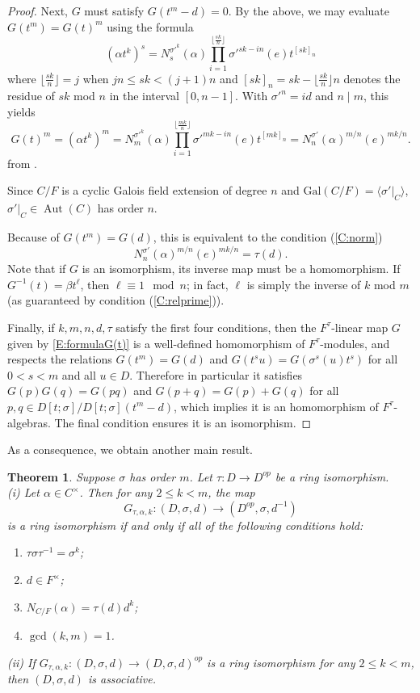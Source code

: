 \documentclass{amsart}
\theoremstyle{plain}
\newtheorem{theorem}{Theorem}[section]
\theoremstyle{definition}
\numberwithin{equation}{section}
\numberwithin{figure}{section}
\DeclareMathOperator{\Aut}{Aut}
\begin{document}
\begin{proof}
Next, $G$ must satisfy $G(t^{m}-d)=0$.  By the above, we may evaluate $G(t^{m})=G(t)^{m}$ using the formula
$$
(\alpha t^k)^s = N_{s}^{{\sigma'}^k}(\alpha)\prod_{i=1}^{\lfloor \frac{sk}{{n}}\rfloor} {\sigma'}^{sk-i{n}}(e)t^{[sk]_{n}}
$$
where $\lfloor \frac{sk}{n}\rfloor=j$ when $j{n}\leq sk<(j+1){n}$ and $[sk]_{n} = sk-\lfloor \frac{sk}{n}\rfloor n$ denotes the residue of $sk$ mod $n$ in the interval $[0,n-1]$. With  ${\sigma'}^{n}=id$ and $n\mid m$,  this yields 
$$
G(t)^{m} = (\alpha t^k)^m = N_{m}^{{\sigma'}^k}(\alpha)\prod_{i=1}^{\lfloor \frac{mk}{{n}}\rfloor} {\sigma'}^{mk-i{n}}(e)t^{[mk]_{n}} =
N_{n}^{{\sigma'}}(\alpha)^{m/n}(e)^{mk/n}.$$
from \cite[Theorem 3.3]{NevPum2025}.

Since $C/F$ is  a cyclic Galois field extension of
 degree $n$ and $\mathrm{Gal}(C/F) = \langle {\sigma'} |_{C} \rangle$, ${\sigma'}|_C\in \Aut(C)$ has order $n$.


Because of $G(t^{m})=G(d)$, this is equivalent to the condition (\ref{C:norm})
$$
N_{n}^{{\sigma'}}(\alpha)^{m/n}(e)^{mk/n}=\tau(d).
$$
Note that if $G$ is an isomorphism, its inverse map must be a homomorphism.  If $G^{-1}(t)=\beta t^\ell$, then $\ell \equiv 1 \mod n$; in fact, $\ell$ is simply the inverse of $k$ mod $m$ (as guaranteed by condition (\ref{C:relprime})).

Finally, if $k,m,n,d,\tau$ satisfy the first four conditions, then the $F^\tau$-linear map $G$ given by \eqref{E:formulaG(t)} is a well-defined homomorphism of $F^\tau$-modules, and respects the relations $G(t^{m})=G(d)$ and $G(t^su)=G(\sigma^s(u)t^s)$ for all $0<s<m$ and all $u\in D$.  Therefore in particular it satisfies $G(p)G(q)=G(pq)$ and $G(p+q)=G(p)+G(q)$ for all $p,q\in D[t;\sigma]/D[t;\sigma](t^m-d)$, which implies it is an homomorphism of $F^\tau$-algebras.  The final condition ensures it is an isomorphism.
\end{proof}


As a consequence, we obtain another main result.



\begin{theorem}\label{thm:main4}
Suppose $\sigma$ has order $m$. Let $\tau:D\to D^{op}$ be a ring isomorphism.
\\ (i) Let $\alpha \in C^\times$.  Then for any $2\leq k < m$, the map
$$
 G_{\tau,\alpha,k}:(D,\sigma,d)\to (D^{op},\sigma,d^{-1})
 $$
 is a ring isomorphism  if and only if all of the following conditions hold:
 \begin{enumerate} \setlength{\itemsep}{0pt}
        \item \label{C:k=1c} $ \tau\sigma \tau^{-1}=\sigma^k$;
        \item \label{C:inFc} $d\in F^\times$; 
        \item \label{C:normc} $N_{C/F}(\alpha)=\tau(d)d^{k}$;
        \item \label{C:relprimec} $\gcd(k,m)=1$.
  \end{enumerate}
   (ii) If $G_{\tau,\alpha,k}:(D,\sigma,d)\to (D,\sigma,d)^{op}$ is a ring isomorphism for any $2\leq k < m$, then $(D,\sigma,d)$ is associative.
\end{theorem}
\end{document}
